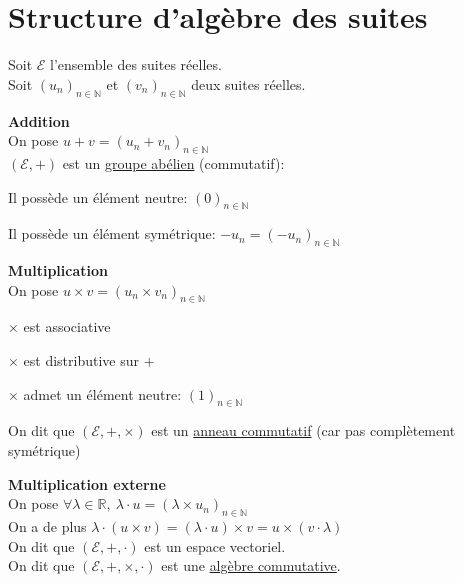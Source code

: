 \documentclass[12pt,twoside,a4paper]{article}
\author{MPSI 2}
\begin{document}
	\maketitle
	\section{Structure d'alg\`ebre des suites}
		\begin{flushleft}
			Soit $\mathcal{E}$ l'ensemble des suites r\'eelles.\\
			Soit $(u_n)_{n\in\mathbb{N}}$ et $(v_n)_{n\in\mathbb{N}}$ deux suites r\'eelles.\\
		\end{flushleft}
		\begin{flushleft}
			\textbf{Addition}\\
			On pose $u+v=(u_n+v_n)_{n\in\mathbb{N}}$\\
			$(\mathcal{E},+)$ est un \underline{groupe ab\'elien} (commutatif):
			\begin{liste}
				\item Il poss\`ede un \'el\'ement neutre: $(0)_{n\in\mathbb{N}}$
				\item Il poss\`ede un \'el\'ement sym\'etrique: $-u_n=(-u_n)_{n\in\mathbb{N}}$
			\end{liste}
		\end{flushleft}
		\begin{flushleft}
			\textbf{Multiplication}\\
			On pose $u\times v=(u_n\times v_n)_{n\in\mathbb{N}}$\\
			\begin{liste}
				\item[$\times$] est associative
				\item[$\times$] est distributive sur $+$
				\item[$\times$] admet un élément neutre: $(1)_{n\in\mathbb{N}}$
			\end{liste}
			On dit que $(\mathcal{E},+,\times)$ est un \underline{anneau commutatif} (car pas complètement symétrique)
		\end{flushleft}
		\begin{flushleft}
			\textbf{Multiplication externe}\\
			On pose $\forall\lambda\in\mathbb{R},\ \lambda\cdot u=(\lambda\times u_n)_{n\in\mathbb{N}}$\\
			On a de plus $\lambda\cdot(u\times v)=(\lambda\cdot u)\times v=u\times(v\cdot\lambda)$\\
			On dit que $(\mathcal{E},+,\cdot)$ est un espace vectoriel.\\
			On dit que $(\mathcal{E},+,\times,\cdot)$ est une \underline{algèbre commutative}.
		\end{flushleft}
\end{document}
